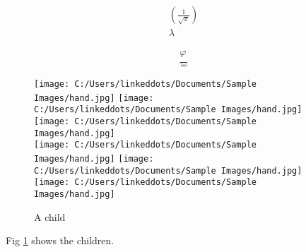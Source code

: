 \documentclass[12pt]{book}
\begin{document}

\begin{align*}
\left(\frac{1}{\sqrt{x}}\right)\\
\lambda
\end{align*}

\newpage

\begin{align*}
\varphi\\
\varpi
\end{align*}


\newpage

\begin{figure}

\texttt{[image: C:/Users/linkeddots/Documents/Sample Images/hand.jpg]}\quad
\texttt{[image: C:/Users/linkeddots/Documents/Sample Images/hand.jpg]}\quad
\texttt{[image: C:/Users/linkeddots/Documents/Sample Images/hand.jpg]}
\\[\baselineskip]
\texttt{[image: C:/Users/linkeddots/Documents/Sample Images/hand.jpg]}\quad
\texttt{[image: C:/Users/linkeddots/Documents/Sample Images/hand.jpg]}\quad
\texttt{[image: C:/Users/linkeddots/Documents/Sample Images/hand.jpg]}

\caption{A child}
\label{fig:children}
\end{figure}
Fig \ref{fig:children} shows the children.
\end{document}
